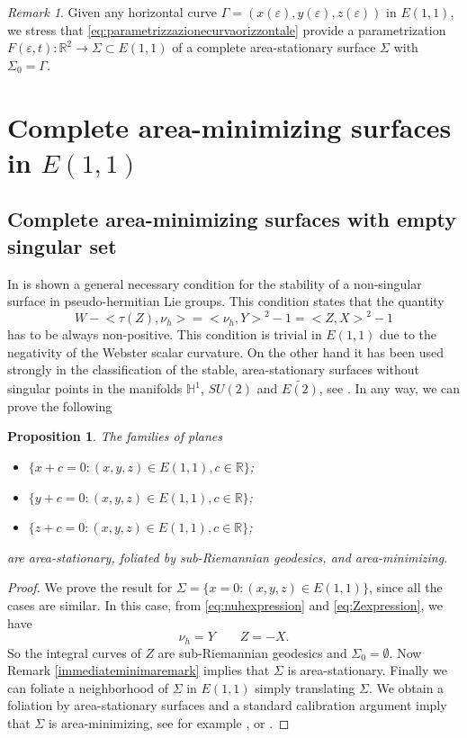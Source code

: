 \documentclass[10pt]{amsart}
\newtheorem{proposition}[theorem]{Proposition}
\theoremstyle{definition}
\theoremstyle{remark}
\newtheorem{remark}[theorem]{Remark}
\numberwithin{equation}{section}
\begin{document}
\begin{remark} Given any horizontal curve ${\Gamma}=(x({\varepsilon}),y({\varepsilon}),z({\varepsilon}))$ in ${E(1,1)}$, we stress that \eqref{eq:parametrizzazionecurvaorizzontale} provide a parametrization $F({\varepsilon},t):{{\mathbb{R}}}^2\rightarrow {\Sigma} \subset {E(1,1)}$ of a complete area-stationary surface ${\Sigma}$ with ${\Sigma}_0={\Gamma}$.

\end{remark}

\section{Complete area-minimizing surfaces in ${E(1,1)}$}\label{sec:minimizing}

\subsection{Complete area-minimizing surfaces with empty singular set} 

In \cite[Proposition~9.8]{MR3044134} is shown a general necessary condition for the stability of a non-singular surface in pseudo-hermitian Lie groups. This condition states that the quantity
\[
W-{\big<{\tau(Z),\nu_h}\big>}={\big<{\nu_h,Y}\big>}^2-1={\big<{Z,X}\big>}^2-1
\]
has to be always non-positive.  This condition is trivial in ${E(1,1)}$ due to the negativity of the Webster scalar curvature. On the other hand it has been used strongly in the classification of the stable, area-stationary surfaces without singular points in the manifolds ${{\mathbb{H}}}^1$, $SU(2)$ and $\widetilde{E(2)}$, see \cite{MR3044134,Ri-Ro-Hu, Ro}. In any way, we can prove the following

\begin{proposition}\label{lemmapianiminimizzanti} The families of planes
\begin{itemize}
\item[(i)] $\{ x+c=0: (x,y,z)\in{E(1,1)}, c\in{{\mathbb{R}}}\}$;
\item[(ii)] $\{ y+c=0: (x,y,z)\in{E(1,1)}, c\in{{\mathbb{R}}}\}$;
\item[(iii)] $\{ z+c=0: (x,y,z)\in{E(1,1)}, c\in{{\mathbb{R}}}\}$;
\end{itemize}
are area-stationary, foliated by sub-Riemannian geodesics, and area-minimizing. 
\end{proposition}

\begin{proof}
We prove the result for ${\Sigma}=\{ x=0: (x,y,z)\in{E(1,1)}\}$, since all the cases are similar. In this case, from \eqref{eq:nuhexpression} and \eqref{eq:Zexpression}, we have
\[
\nu_h=Y \qquad Z=-X.
\]
So the integral curves of $Z$ are sub-Riemannian geodesics and ${\Sigma}_0=\emptyset$. Now Remark \ref{immediateminimaremark} implies that ${\Sigma}$ is area-stationary. Finally we can foliate a neighborhood of ${\Sigma}$ in ${E(1,1)}$ simply translating ${\Sigma}$. We obtain a foliation by area-stationary surfaces and a standard calibration argument imply that ${\Sigma}$ is area-minimizing, see for example \cite{BA-SC-Vi}, \cite{Ri1} or \cite[\S~5]{Ri-Ro}.
\end{proof}
\end{document}

